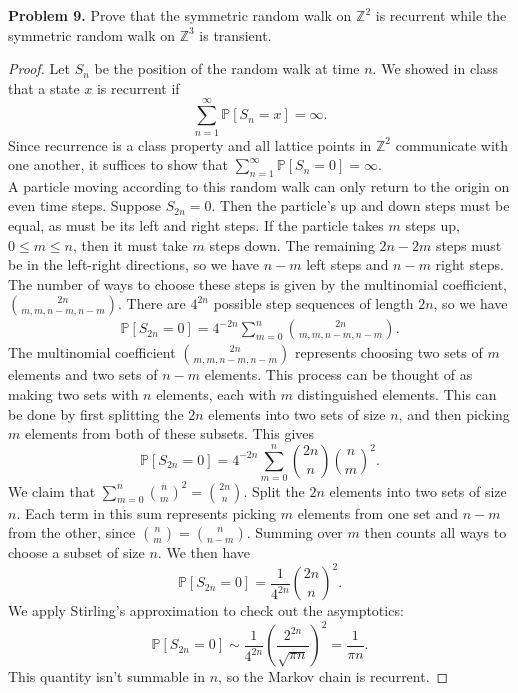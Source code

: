\documentclass[11pt,letterpaper]{report}
\newcommand{\integers}{\mathbb{Z}}
\newcommand{\Prob}{\mathbb{P}}
\begin{document}
\noindent\textbf{Problem 9. }
Prove that the symmetric random walk on $\integers^2$ is recurrent while the symmetric random walk on $\integers^3$ is transient.
\begin{proof}
	Let $S_n$ be the position of the random walk at time $n$. We showed in class that a state $x$ is recurrent if
	\[
	\sum_{n=1}^\infty \Prob[S_n = x] = \infty.
	\]
	Since recurrence is a class property and all lattice points in $\integers^2$ communicate with one another, it suffices to show that $\sum_{n=1}^\infty \Prob[S_n =0]= \infty$.\\

	\noindent A particle moving according to this random walk can only return to the origin on even time steps. Suppose $S_{2n} = 0$. Then the particle's up and down steps must be equal, as must be its left and right steps. If the particle takes $m$ steps up, $0\leq m\leq n$, then it must take $m$ steps down. The remaining $2n-2m$ steps must be in the left-right directions, so we have $n-m$ left steps and $n-m$ right steps. The number of ways to choose these steps is given by the multinomial coefficient, $\binom{2n}{m,m, n-m, n-m}$. There are $4^{2n}$ possible step sequences of length $2n$, so we have
	\begin{align*}
		\Prob[S_{2n} = 0] = 4^{-2n}\sum_{m=0}^n\binom{2n}{m, m, n-m, n-m}.
	\end{align*}
	The multinomial coefficient $\binom{2n}{m, m, n-m, n-m}$ represents choosing two sets of $m$ elements and two sets of $n-m$ elements. This process can be thought of as making two sets with $n$ elements, each with $m$ distinguished elements. This can be done by first splitting the $2n$ elements into two sets of size $n$, and then picking $m$ elements from both of these subsets. This gives
	\[
	\Prob[S_{2n}=0] = 4^{-2n}\sum_{m=0}^n\binom{2n}{n}\binom{n}{m}^2.
	\]
	We claim that $\sum_{m=0}^n\binom{n}{m}^2 = \binom{2n}{n}$. Split the $2n$ elements into two sets of size $n$. Each term in this sum represents picking $m$ elements from one set and $n-m$ from the other, since $\binom{n}{m} = \binom{n}{n-m}$. Summing over $m$ then counts all ways to choose a subset of size $n$. We then have
	\[
	\Prob[S_{2n}=0] = \frac{1}{4^{2n}}\binom{2n}{n}^2.
	\]
	We apply Stirling's approximation to check out the asymptotics:
	\[
	\Prob[S_{2n}=0] \sim \frac{1}{4^{2n}}\left(\frac{2^{2n}}{\sqrt{\pi n}}\right)^2 =\frac{1}{\pi n}.
	\]
	This quantity isn't summable in $n$, so the Markov chain is recurrent.
\end{proof}
\end{document}
